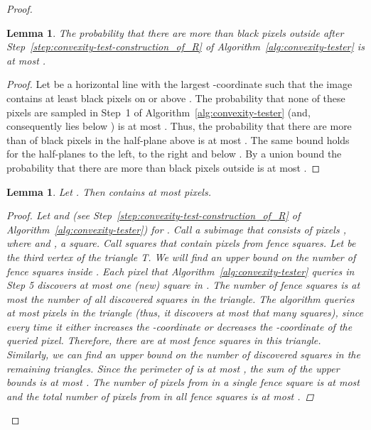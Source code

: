 \documentclass[11pt,english]{article}
\newtheorem{lemma}[theorem]{Lemma}
\numberwithin{figure}{section}
\begin{document}
\begin{proof}
\begin{lemma}\label{lem:black-pixels-outside-R}
The probability that there are more than  black pixels outside
 after Step~\ref{step:convexity-test-construction_of_R} of Algorithm~\ref{alg:convexity-tester}
is at most .
\end{lemma}
\begin{proof}
Let  be a horizontal line with the largest -coordinate such that the image
 contains at least  black pixels on or above . The
probability that none of these pixels are sampled in Step~1 of Algorithm~\ref{alg:convexity-tester}
(and, consequently  lies below ) is at most
. Thus, the probability that
there are more than  of black pixels in the half-plane
above  is at most . The same bound holds for the half-planes to the left, to the right and below .
By a union bound the probability that there are more than  black pixels outside  is at most
.
\end{proof}
\begin{lemma}\label{lem:total_number_of_pixels_in_F}
Let . Then  contains at most  pixels.
\begin{proof}
Let  and  (see Step~\ref{step:convexity-test-construction_of_R} of
Algorithm~\ref{alg:convexity-tester}) for .
Call a subimage that consists of pixels , where  and
, a \emph{square}. Call squares that contain pixels from 
\emph{fence squares}. Let  be the third vertex of the triangle T.
We will find an upper bound on the number of fence squares inside .
Each pixel that Algorithm~\ref{alg:convexity-tester}
queries in Step 5 discovers at most one (new) square in . The
number of fence squares is at most the number of all discovered squares in the
triangle. The algorithm queries at most 
pixels in the triangle (thus, it discovers at most that many squares), since every time it either increases the -coordinate or decreases the -coordinate of the queried pixel.
Therefore, there are at most 
fence squares in this triangle. Similarly, we can
find an upper bound on the number of discovered squares in the remaining
triangles. Since the perimeter of  is at most , the sum of the upper bounds is at most
.
The number of pixels from  in a single
fence square is at most  and
the total number of pixels from  in all
fence squares is at most .
\end{proof}
\end{lemma}


\end{proof}
\end{document}
